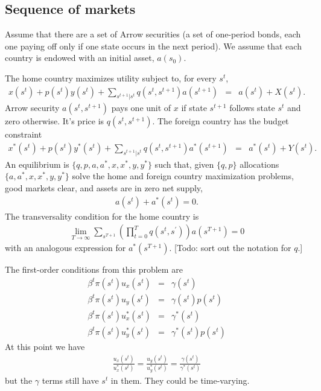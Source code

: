 \documentclass[11pt,pdftex,twoside,letterpaper]{exam}
\begin{document}
\subsection{Sequence of markets}
Assume that there are a set of Arrow securities (a set of one-period bonds, each one paying off only if one state occurs in the next period). We assume that each country is endowed with an initial asset, $a(s_0)$.

The home country maximizes utility subject to, for every $s^t$,
\begin{eqnarray}
  x(s^t) + p(s^t)y(s^t) +\sum_{s^{t+1}|s^t}q(s^t,s^{t+1})a(s^{t+1})&=& a(s^t)+X(s^t).
\end{eqnarray}
Arrow security $a(s^t,s^{t+1})$ pays one unit of $x$ if state $s^{t+1}$ follows state $s^t$ and zero otherwise. It's price is $q(s^t,s^{t+1})$. The foreign country has the budget constraint
\begin{eqnarray}
  x^*(s^t) + p(s^t)y^*(s^t) +\sum_{s^{t+1}|s^t}q(s^t,s^{t+1})a^*(s^{t+1})&=& a^*(s^t)+Y(s^t).
\end{eqnarray}
An equilibrium is $\{q, p, a, a^*, x, x^*, y, y^*\}$ such that, given $\{q,p\}$ allocations $\{a, a^*, x, x^*, y, y^*\}$ solve the home and foreign country maximization problems, good markets clear, and assets are in zero net supply,
\begin{eqnarray}
  a(s^t)+ a^*(s^t)=0.
\end{eqnarray}
The transversality condition for the home country is
\begin{eqnarray}
  \lim_{T\rightarrow\infty}\sum_{s^{T+1}}\left( \prod_{t=0}^T q(s^t,s^\prime)\right)a(s^{T+1})=0
\end{eqnarray}
with an analogous expression for $a^*(s^{T+1})$. [Todo: sort out the notation for $q$.]

The first-order conditions from this problem are
\begin{eqnarray}
  \beta^t\pi(s^t)u_x(s^t) &=& \gamma(s^t) \\
  \beta^t\pi(s^t)u_y(s^t) &=& \gamma(s^t) p(s^t)\\
  \beta^t\pi(s^t)u_x^*(s^t) &=& \gamma^*(s^t) \\
  \beta^t\pi(s^t)u_y^*(s^t) &=& \gamma^*(s^t)  p(s^t)
\end{eqnarray}
At this point we have
\begin{eqnarray}
  \frac{u_x(s^t)}{u_x^*(s^t)} = \frac{u_y(s^t)}{u_y^*(s^t)} = \frac{\gamma(s^t)}{\gamma^*(s^t)}
\end{eqnarray}
but the $\gamma$ terms still have $s^t$ in them. They could be time-varying.
\end{document}
